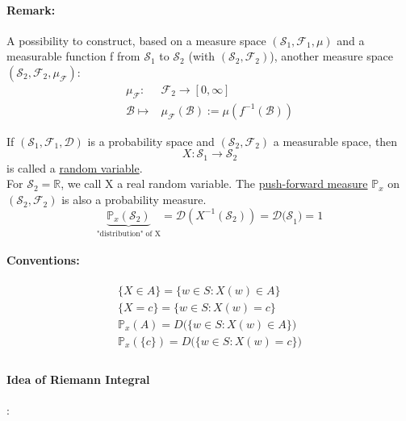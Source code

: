 \documentclass[10pt,a4paper]{article}
\theoremstyle{definition}
\theoremstyle{plain}
\begin{document}
\paragraph{Remark:} A possibility to construct, based on a measure space $(\mathcal{S}_1, \mathcal{F}_1, \mu)$ and a measurable function f from $\mathcal{S}_1$ to $\mathcal{S}_2$ (with $(\mathcal{S}_2, \mathcal{F}_2)$), another measure space $(\mathcal{S}_2, \mathcal{F}_2, \mu_{\mathcal{F}})$:
\begin{eqnarray*}
	\mu_\mathcal{F}: & \mathcal{F}_2 \rightarrow [0, \infty] \\
	 \mathcal{B}\mapsto & \mu_\mathcal{F}(\mathcal{B}) := \mu(f^{-1} (\mathcal{B}))
\end{eqnarray*}  
\begin{boxeddef}
	If $(\mathcal{S}_1, \mathcal{F}_1, \mathcal{D})$ is a probability space and $(\mathcal{S}_2, \mathcal{F}_2)$ a measurable space, then
	$$X: \mathcal{S}_1 \rightarrow \mathcal{S}_2$$
	is called a \underline{random variable}. \\
	For $\mathcal{S}_2 = \mathbb{R}$, we call X a real random variable. The \underline{push-forward measure} $\mathbb{P}_x$ on $(\mathcal{S}_2, \mathcal{F}_2)$ is also a probability measure.
	$$\underbrace{\mathbb{P}_x(\mathcal{S}_2)}_{\text{"distribution" of X}} = \mathcal{D}(X^{-1}(\mathcal{S}_2)) = \mathcal{D(S}_1) = 1$$
\end{boxeddef}
\paragraph{Conventions:}
\begin{eqnarray*}
\{ X \in A \} = \{w \in S: X(w) \in A \}\\
\{X = c\} = \{w \in S: X(w) = c\}\\
\mathbb{P}_x(A) = D\big(\{w \in S: X(w) \in A\}\big)\\
\mathbb{P}_x(\{c\}) = D\big(\{w \in S: X(w) = c\}\big)\\	
\end{eqnarray*}

\paragraph{Idea of Riemann Integral}:
\end{document}
